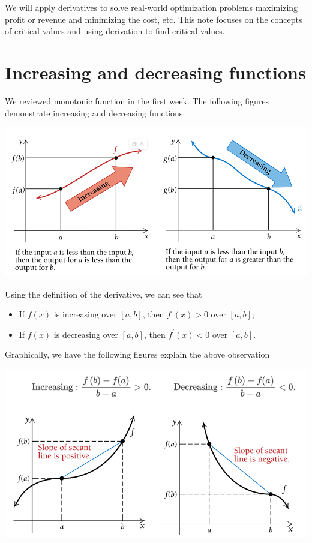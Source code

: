 \documentclass[
]{book}
\begin{document}
\hfill\break

We will apply derivatives to solve real-world optimization problems maximizing profit or revenue and minimizing the cost, etc. This note focuses on the concepts of critical values and using derivation to find critical values.

\hfill\break

\hypertarget{increasing-and-decreasing-functions}{%
\section{Increasing and decreasing functions}\label{increasing-and-decreasing-functions}}

We reviewed monotonic function in the first week. The following figures demonstrate increasing and decreasing functions.

\begin{center}\includegraphics[width=0.8\linewidth]{img07/w07-MonotonicFunctions} \end{center}

Using the definition of the derivative, we can see that

\begin{itemize}
\item
  If \(f(x)\) is increasing over \([a, b]\), then \(f^\prime(x) > 0\) over \([a, b]\);
\item
  If \(f(x)\) is decreasing over \([a, b]\), then \(f^\prime(x) < 0\) over \([a, b]\).
\end{itemize}

Graphically, we have the following figures explain the above observation

\begin{center}\includegraphics[width=0.8\linewidth]{img07/w07-DerivativeVSmonotonicity} \end{center}
\end{document}
